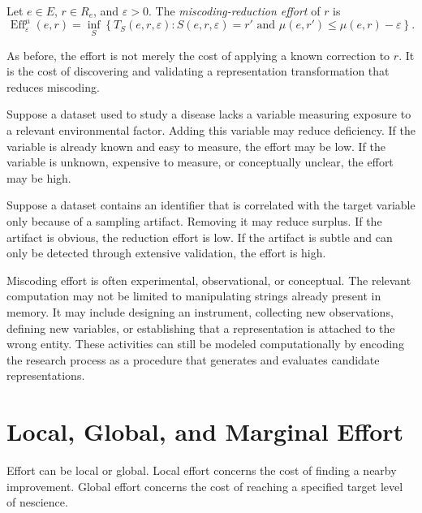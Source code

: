 \begin{definition}
Let \(e\in E\), \(r\in R_e\), and \(\varepsilon>0\). The \emph{miscoding-reduction effort} of \(r\) is
\[
\operatorname{Eff}^{\mu}_{\varepsilon}(e,r)
=
\inf_S
\left\{
T_S(e,r,\varepsilon):
S(e,r,\varepsilon)=r'
\text{ and }
\mu(e,r')\leq \mu(e,r)-\varepsilon
\right\}.
\]
\end{definition}

As before, the effort is not merely the cost of applying a known correction to \(r\). It is the cost of discovering and validating a representation transformation that reduces miscoding.

\begin{example}
Suppose a dataset used to study a disease lacks a variable measuring exposure to a relevant environmental factor. Adding this variable may reduce deficiency. If the variable is already known and easy to measure, the effort may be low. If the variable is unknown, expensive to measure, or conceptually unclear, the effort may be high.
\end{example}

\begin{example}
Suppose a dataset contains an identifier that is correlated with the target variable only because of a sampling artifact. Removing it may reduce surplus. If the artifact is obvious, the reduction effort is low. If the artifact is subtle and can only be detected through extensive validation, the effort is high.
\end{example}

Miscoding effort is often experimental, observational, or conceptual. The relevant computation may not be limited to manipulating strings already present in memory. It may include designing an instrument, collecting new observations, defining new variables, or establishing that a representation is attached to the wrong entity. These activities can still be modeled computationally by encoding the research process as a procedure that generates and evaluates candidate representations.

\section{Local, Global, and Marginal Effort}
\label{sec:local_global_marginal_effort}

Effort can be local or global. Local effort concerns the cost of finding a nearby improvement. Global effort concerns the cost of reaching a specified target level of nescience.

